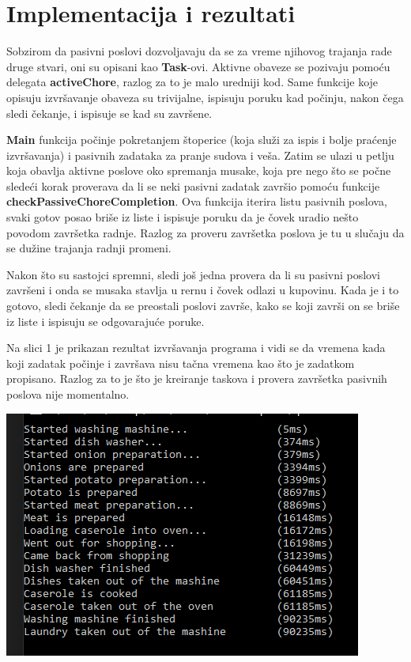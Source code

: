 \documentclass[12pt]{article}
\begin{document}
\section{Implementacija i rezultati}
\par Sobzirom da pasivni poslovi dozvoljavaju da se za vreme njihovog trajanja
rade druge stvari, oni su opisani kao \textbf{Task}-ovi.
Aktivne obaveze se pozivaju pomoću delegata \textbf{activeChore}, razlog za to
je malo uredniji kod.
Same funkcije koje opisuju izvršavanje obaveza su trivijalne, ispisuju poruku
kad počinju, nakon čega sledi čekanje, i ispisuje se kad su završene.
\par \textbf{Main} funkcija počinje pokretanjem štoperice (koja služi za ispis
i bolje praćenje izvršavanja) i pasivnih zadataka za pranje sudova i veša.
Zatim se ulazi u petlju koja obavlja aktivne poslove oko spremanja musake, koja
pre nego što se počne sledeći korak proverava da li se neki pasivni zadatak
završio pomoću funkcije \textbf{checkPassiveChoreCompletion}.
Ova funkcija iterira listu pasivnih poslova, svaki gotov posao briše iz liste
i ispisuje poruku da je čovek uradio nešto povodom završetka radnje.
Razlog za proveru završetka poslova je tu u slučaju da se dužine trajanja radnji
promeni.
\par Nakon što su sastojci spremni, sledi još jedna provera da li su pasivni
poslovi završeni i onda se musaka stavlja u rernu i čovek odlazi u kupovinu.
Kada je i to gotovo, sledi čekanje da se preostali poslovi završe, kako se koji
završi on se briše iz liste i ispisuju se odgovarajuće poruke.
\newpage
\par Na slici 1 je prikazan rezultat izvršavanja programa i vidi se da vremena
kada koji zadatak počinje i završava nisu tačna vremena kao što je zadatkom
propisano.
Razlog za to je što je kreiranje taskova i provera završetka pasivnih poslova
nije momentalno.
\begin{center}
	\includegraphics{figs/Rezultat.PNG}
\end{center}
\end{document}
